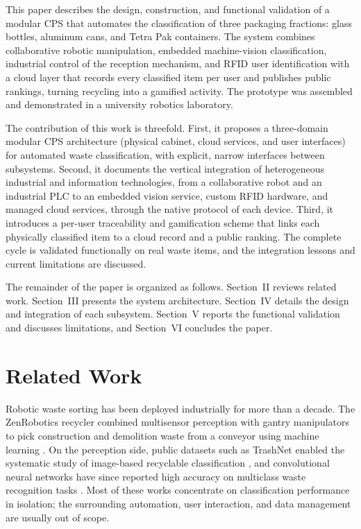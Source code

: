 \documentclass[conference]{IEEEtran}
\begin{document}
This paper describes the design, construction, and functional validation of a modular CPS that automates the classification of three packaging fractions: glass bottles, aluminum cans, and Tetra Pak containers. The system combines collaborative robotic manipulation, embedded machine-vision classification, industrial control of the reception mechanism, and RFID user identification with a cloud layer that records every classified item per user and publishes public rankings, turning recycling into a gamified activity. The prototype was assembled and demonstrated in a university robotics laboratory.

The contribution of this work is threefold. First, it proposes a three-domain modular CPS architecture (physical cabinet, cloud services, and user interfaces) for automated waste classification, with explicit, narrow interfaces between subsystems. Second, it documents the vertical integration of heterogeneous industrial and information technologies, from a collaborative robot and an industrial PLC to an embedded vision service, custom RFID hardware, and managed cloud services, through the native protocol of each device. Third, it introduces a per-user traceability and gamification scheme that links each physically classified item to a cloud record and a public ranking. The complete cycle is validated functionally on real waste items, and the integration lessons and current limitations are discussed.

The remainder of the paper is organized as follows. Section~II reviews related work. Section~III presents the system architecture. Section~IV details the design and integration of each subsystem. Section~V reports the functional validation and discusses limitations, and Section~VI concludes the paper.

\section{Related Work}
Robotic waste sorting has been deployed industrially for more than a decade. The ZenRobotics recycler combined multisensor perception with gantry manipulators to pick construction and demolition waste from a conveyor using machine learning \cite{b4}. On the perception side, public datasets such as TrashNet enabled the systematic study of image-based recyclable classification \cite{b5}, and convolutional neural networks have since reported high accuracy on multiclass waste recognition tasks \cite{b6}. Most of these works concentrate on classification performance in isolation; the surrounding automation, user interaction, and data management are usually out of scope.
\end{document}
